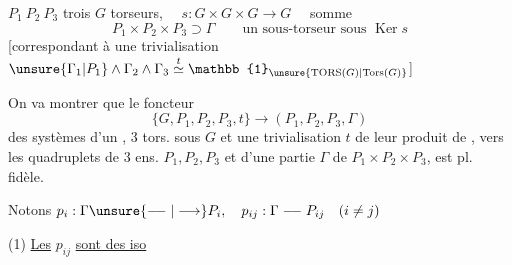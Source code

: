 \(P_1\ P_2\ P_3\) trois \(G\) torseurs, \(\quad s:G\times G\times G\longrightarrow G\quad\)  somme
\[
 P_1\times P_2\times P_3\supset \Gamma\qquad\text{un sous-torseur sous }\operatorname{Ker}s
\]
[correspondant à une trivialisation \(\unsure{\Gamma_1|P_1}\wedge \Gamma_2\wedge \Gamma_3\overset{t}{\simeq}\mathbb{1}_{\unsure{\mathrm{TORS}(G)|\mathrm{Tors}(G)}}\)]

On va montrer que le foncteur
\[
 \{G,P_1,P_2,P_3,t\}\longrightarrow(P_1,P_2,P_3,\Gamma)
\]
 des systèmes d'un  , \(3\) tors.  sous \(G\) et une trivialisation \(t\) de leur produit de , vers les quadruplets de \(3\) ens. \(P_1,P_2,P_3\) et d'une partie \(\Gamma\) de \(P_1\times P_2\times P_3\), est pl. fidèle.

Notons \(p_i:\Gamma\unsure{\relbar\joinrel\relbar|\longrightarrow} P_i,\quad p_{ij}:\Gamma\relbar\joinrel\relbar P_{ij}\quad(i\ne j)\)

(1) \uline{Les} \(p_{ij}\) \uline{sont des iso}

